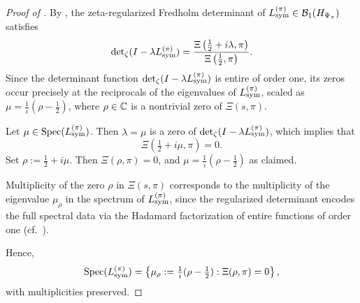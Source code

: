 \begin{proof}[Proof of ]
By , the zeta-regularized Fredholm determinant of \( L_{\mathrm{sym}}^{(\pi)} \in \mathcal{B}_1(H_{\Psi_{\pi}}) \) satisfies
\[
\det\nolimits_{\zeta}(I - \lambda L_{\mathrm{sym}}^{(\pi)}) = \frac{\Xi\left(\tfrac{1}{2} + i\lambda, \pi\right)}{\Xi\left(\tfrac{1}{2}, \pi\right)}.
\]
Since the determinant function \( \det\nolimits_{\zeta}(I - \lambda L_{\mathrm{sym}}^{(\pi)}) \) is entire of order one, its zeros occur precisely at the reciprocals of the eigenvalues of \( L_{\mathrm{sym}}^{(\pi)} \), scaled as \( \mu = \frac{1}{i}(\rho - \tfrac{1}{2}) \), where \( \rho \in \mathbb{C} \) is a nontrivial zero of \( \Xi(s, \pi) \).

Let \( \mu \in \operatorname{Spec}(L_{\mathrm{sym}}^{(\pi)}) \). Then \( \lambda = \mu \) is a zero of \( \det\nolimits_{\zeta}(I - \lambda L_{\mathrm{sym}}^{(\pi)}) \), which implies that
\[
\Xi\left(\tfrac{1}{2} + i\mu, \pi\right) = 0.
\]
Set \( \rho := \tfrac{1}{2} + i\mu \). Then \( \Xi(\rho, \pi) = 0 \), and \( \mu = \frac{1}{i}(\rho - \tfrac{1}{2}) \) as claimed.

Multiplicity of the zero \( \rho \) in \( \Xi(s, \pi) \) corresponds to the multiplicity of the eigenvalue \( \mu_\rho \) in the spectrum of \( L_{\mathrm{sym}}^{(\pi)} \), since the regularized determinant encodes the full spectral data via the Hadamard factorization of entire functions of order one (cf.~\cite[Ch.~2]{Levin1996EntireLectures}).

Hence,
\[
\operatorname{Spec}(L_{\mathrm{sym}}^{(\pi)}) = \left\{ \mu_\rho := \tfrac{1}{i}(\rho - \tfrac{1}{2}) : \Xi(\rho, \pi) = 0 \right\},
\]
with multiplicities preserved.
\end{proof}
